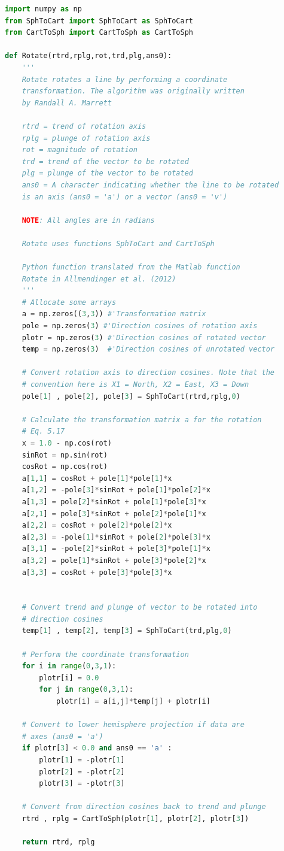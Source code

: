 \documentclass[a4paper , 12pt]{book}
\begin{document}
\begin{lstlisting}[language=Python, frame=single]
import numpy as np
from SphToCart import SphToCart as SphToCart
from CartToSph import CartToSph as CartToSph

def Rotate(rtrd,rplg,rot,trd,plg,ans0):
    '''
	Rotate rotates a line by performing a coordinate 
	transformation. The algorithm was originally written 
	by Randall A. Marrett

	rtrd = trend of rotation axis
	rplg = plunge of rotation axis
	rot = magnitude of rotation
	trd = trend of the vector to be rotated
	plg = plunge of the vector to be rotated
	ans0 = A character indicating whether the line to be rotated 
	is an axis (ans0 = 'a') or a vector (ans0 = 'v')

	NOTE: All angles are in radians
	
	Rotate uses functions SphToCart and CartToSph
	
	Python function translated from the Matlab function 
	Rotate in Allmendinger et al. (2012)
	'''
    # Allocate some arrays
    a = np.zeros((3,3)) #'Transformation matrix
    pole = np.zeros(3) #'Direction cosines of rotation axis
    plotr = np.zeros(3) #'Direction cosines of rotated vector
    temp = np.zeros(3)  #'Direction cosines of unrotated vector
    
    # Convert rotation axis to direction cosines. Note that the 
    # convention here is X1 = North, X2 = East, X3 = Down
    pole[1] , pole[2], pole[3] = SphToCart(rtrd,rplg,0)
    
    # Calculate the transformation matrix a for the rotation
    # Eq. 5.17
    x = 1.0 - np.cos(rot)
    sinRot = np.sin(rot)
    cosRot = np.cos(rot)
    a[1,1] = cosRot + pole[1]*pole[1]*x
    a[1,2] = -pole[3]*sinRot + pole[1]*pole[2]*x
    a[1,3] = pole[2]*sinRot + pole[1]*pole[3]*x
    a[2,1] = pole[3]*sinRot + pole[2]*pole[1]*x
    a[2,2] = cosRot + pole[2]*pole[2]*x
    a[2,3] = -pole[1]*sinRot + pole[2]*pole[3]*x
    a[3,1] = -pole[2]*sinRot + pole[3]*pole[1]*x
    a[3,2] = pole[1]*sinRot + pole[3]*pole[2]*x
    a[3,3] = cosRot + pole[3]*pole[3]*x
    
    
    # Convert trend and plunge of vector to be rotated into 
    # direction cosines
    temp[1] , temp[2], temp[3] = SphToCart(trd,plg,0)
    
    # Perform the coordinate transformation
    for i in range(0,3,1):
        plotr[i] = 0.0
        for j in range(0,3,1):
            plotr[i] = a[i,j]*temp[j] + plotr[i]
            
    # Convert to lower hemisphere projection if data are
    # axes (ans0 = 'a')
    if plotr[3] < 0.0 and ans0 == 'a' :
        plotr[1] = -plotr[1]
        plotr[2] = -plotr[2]
        plotr[3] = -plotr[3]
        
    # Convert from direction cosines back to trend and plunge
    rtrd , rplg = CartToSph(plotr[1], plotr[2], plotr[3])
    
    return rtrd, rplg
\end{lstlisting}
\end{document}
